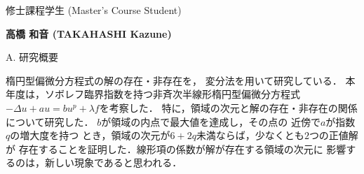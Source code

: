 \documentclass[a4j,twocolumn]{jarticle}
\begin{document}


修士課程学生 (Master's Course Student)



{\bf 高橋 和音 (TAKAHASHI Kazune)}

%
%
%
%


\vspace{0.2cm}
\noindent
A. 研究概要

\vspace{0.1cm}


楕円型偏微分方程式の解の存在・非存在を，
変分法を用いて研究している．
本年度は，ソボレフ臨界指数を持つ非斉次半線形楕円型偏微分方程式
$-\Delta u + a u = b u^p + \lambda f$を考察した．
特に，領域の次元と解の存在・非存在の関係について研究した．
$b$が領域の内点で最大値を達成し，その点の
近傍で$a$が指数$q$の増大度を持つ
とき，領域の次元が$6 + 2q$未満ならば，少なくとも$2$つの正値解が
存在することを証明した．線形項の係数が解が存在する領域の次元に
影響するのは，新しい現象であると思われる．
\end{document}
